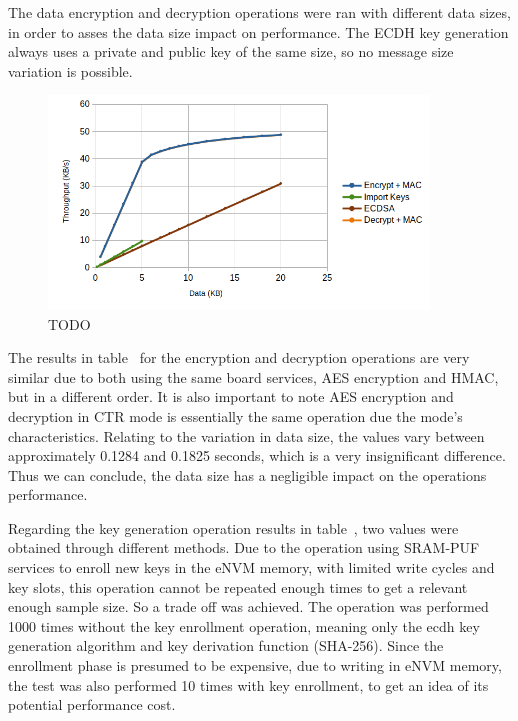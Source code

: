The data encryption and decryption operations were ran with different data sizes, in order to asses the data size impact on performance.
The ECDH key generation always uses a private and public key of the same size, so no message size variation is possible.



\begin{figure}[h!]
	\centering
	\includegraphics[width=0.9\textwidth]{./Images/services-tput.png}
	\caption{TODO}
	\label{fig:performance:services-tput}
\end{figure}

The results in table~ for the encryption and decryption operations are very similar due to both using the same board services, AES encryption and HMAC, but in a different order. It is also important to note AES encryption and decryption in CTR mode is essentially the same operation due the mode's characteristics.
Relating to the variation in data size, the values vary between approximately 0.1284 and 0.1825 seconds, which is a very insignificant difference. Thus we can conclude, the data size has a negligible impact on the operations performance.

Regarding the key generation operation results in table~, two values were obtained through different methods. Due to the operation using SRAM-PUF services to enroll new keys in the eNVM memory, with limited write cycles and key slots, this operation cannot be repeated enough times to get a relevant enough sample size.
So a trade off was achieved. The operation was performed 1000 times without the key enrollment operation, meaning only the ecdh key generation algorithm and key derivation function (SHA-256).
Since the enrollment phase is presumed to be expensive, due to writing in eNVM memory, the test was also performed 10 times with key enrollment, to get an idea of its potential performance cost.

